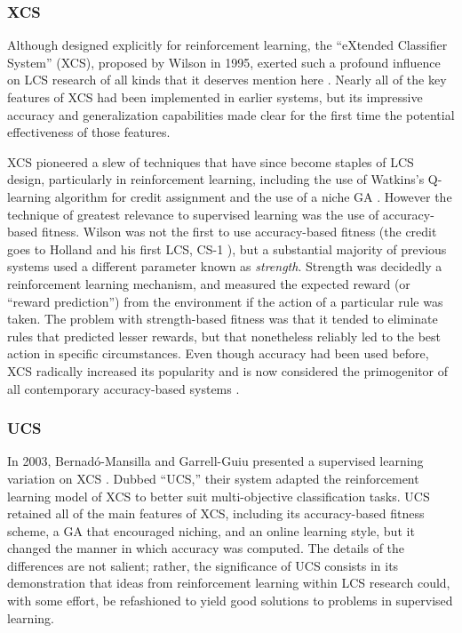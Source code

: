 \documentclass[12pt]{article}
\begin{document}
\subsubsection{XCS}

Although designed explicitly for reinforcement learning, the ``eXtended Classifier System'' (XCS), proposed by Wilson in 1995, exerted such a profound influence on LCS research of all kinds that it deserves mention here \cite{wilson_classifier_1995}. Nearly all of the key features of XCS had been implemented in earlier systems, but its impressive accuracy and generalization capabilities made clear for the first time the potential effectiveness of those features.

XCS pioneered a slew of techniques that have since become staples of LCS design, particularly in reinforcement learning, including the use of Watkins's Q-learning algorithm for credit assignment and the use of a niche GA \cite{urbanowicz_learning_2009}. However the technique of greatest relevance to supervised learning was the use of accuracy-based fitness. Wilson was not the first to use accuracy-based fitness (the credit goes to Holland and his first LCS, CS-1 \cite{holland_cognitive_1977}), but a substantial majority of previous systems used a different parameter known as \emph{strength}. Strength was decidedly a reinforcement learning mechanism, and measured the expected reward (or ``reward prediction'') from the environment if the action of a particular rule was taken. The problem with strength-based fitness was that it tended to eliminate rules that predicted lesser rewards, but that nonetheless reliably led to the best action in specific circumstances. Even though accuracy had been used before, XCS radically increased its popularity and is now considered the primogenitor of all contemporary accuracy-based systems \cite{urbanowicz_learning_2009}.

\subsubsection{UCS}

In 2003, Bernad\'o-Mansilla and Garrell-Guiu presented a supervised learning variation on XCS \cite{bernado-mansilla_accuracy-based_2003}. Dubbed ``UCS,'' their system adapted the reinforcement learning model of XCS to better suit multi-objective classification tasks. UCS retained all of the main features of XCS, including its accuracy-based fitness scheme, a GA that encouraged niching, and an online learning style, but it changed the manner in which accuracy was computed. The details of the differences are not salient; rather, the significance of UCS consists in its demonstration that ideas from reinforcement learning within LCS research could, with some effort, be refashioned to yield good solutions to problems in supervised learning.
\end{document}
